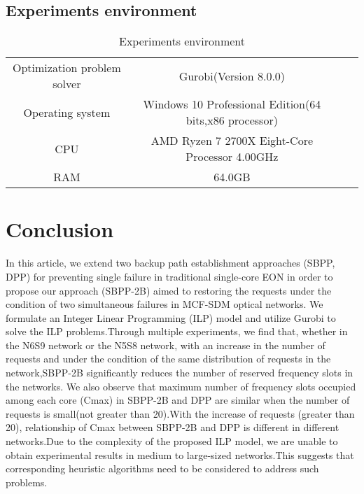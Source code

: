 \documentclass[a4paper,11pt]{report}
\begin{document}
\section{Experiments environment}
    \begin{table}[!h]
    \caption{Experiments environment}
    \label{Experiments environment}
    \begin{center}
    \begin{tabular}{cccc}
    \toprule
    Optimization problem solver & Gurobi(Version 8.0.0)\\
    Operating system & Windows 10 Professional Edition(64 bits,x86 processor)\\
    CPU & AMD Ryzen 7 2700X Eight-Core Processor 4.00GHz\\
    RAM & 64.0GB\\
    \bottomrule 
    \end{tabular}
    \end{center}
    \end{table}



    

\chapter{Conclusion}
    In this article, we extend two backup path establishment approaches (SBPP, DPP) for preventing single failure in traditional single-core EON in order to propose our approach (SBPP-2B) aimed to restoring the requests under the condition of two simultaneous failures in MCF-SDM optical networks. We formulate an Integer Linear Programming (ILP) model and utilize Gurobi to solve the ILP problems.Through multiple experiments, we find that, whether in the N6S9 network or the N5S8 network, with an increase in the number of requests and under the condition of the same distribution of requests in the network,SBPP-2B  significantly reduces the number of reserved frequency slots in the networks. We also observe that maximum number of frequency slots occupied among each core (Cmax) in SBPP-2B and DPP are similar when the number of requests is small(not greater than 20).With the increase of requests (greater than 20), relationship of Cmax between SBPP-2B and DPP is different in different networks.Due to the complexity of the proposed ILP model, we are unable to obtain experimental results in medium to large-sized networks.This suggests that corresponding heuristic algorithms need to be considered to address such problems.
    
\end{document}
